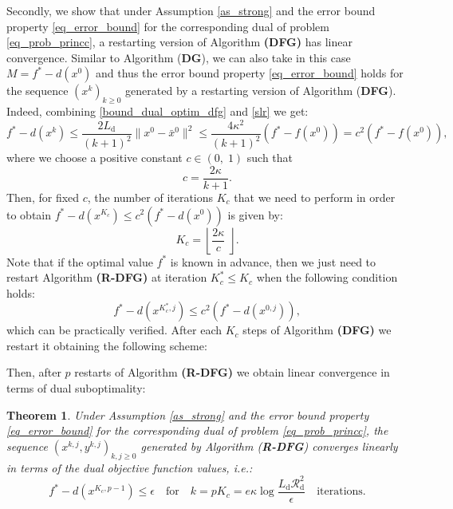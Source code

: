 \documentclass{gOMS2e}
\theoremstyle{plain}
\newtheorem{theorem}{Theorem}[section]
\theoremstyle{definition}
\theoremstyle{remark}
\begin{document}
\noindent Secondly, we  show that under Assumption \eqref{as_strong}
and the error bound property \eqref{eq_error_bound} for the
corresponding dual  of problem  \eqref{eq_prob_princc}, a restarting
version of Algorithm {\bf (DFG)} has linear convergence. Similar to
Algorithm (\textbf{DG}), we can also take in this  case  $M = f^*
-d(x^0)$ and thus the error bound property \eqref{eq_error_bound}
holds for the sequence $(x^k)_{k \geq 0}$ generated by  a restarting
version of Algorithm (\textbf{DFG}). Indeed, combining
\eqref{bound_dual_optim_dfg} and \eqref{slr} we get:
\[ f^* - d(x^k)   \leq \frac{2 L_\text{d}}{(k+1)^2} \| x^0 - \bar{x}^0\|^2 \leq
 \frac{4 \kappa^2}{(k+1)^2} (f^*  - f(x^0)) = c^2 (f^* - f(x^0)), \]
where we choose a positive constant $c \in (0, \; 1)$ such that
\[  c = \frac{2 \kappa }{k+1}. \]
Then, for fixed $c$, the number of iterations $K_c$ that we need to
perform in order to obtain $f^*  - d(x^{K_c})  \leq c^2 ( f^* - d(x^0)) $
is given by:
\[ K_c = \left  \lfloor \frac{2 \kappa}{c} \; \right \rfloor.  \]
Note that if the optimal value $f^*$ is known in advance, then we just need to
restart  Algorithm {\bf (R-DFG)} at iteration $K_c^* \leq
K_c$ when the following condition holds:
\[   f^* - d(x^{K_c^*,j})  \leq c^2 (f^* - d(x^{0,j})),  \]
which can be practically   verified. After each $K_c$ steps of Algorithm {\bf (DFG)} we
restart it obtaining the following scheme:
\begin{center}
\end{center}
Then, after $p$ restarts of Algorithm {\bf (R-DFG)} we obtain linear
convergence in terms of dual suboptimality:

\begin{theorem}
\label{th_ebdualsuboptdfg} Under Assumption \eqref{as_strong} and
the error  bound property \eqref{eq_error_bound} for the
corresponding dual  of problem  \eqref{eq_prob_princc},  the
sequence $\left(x^{k,j},y^{k,j} \right)_{k,j\geq 0}$  generated by
Algorithm ({\bf R-DFG}) converges linearly in terms of the  dual
objective function values, i.e.:
\begin{equation}
\label{bound_dual_optim_dfgeb}
 f^* - d({x}^{K_c,p-1}) \leq \epsilon \quad \text{for} \quad k = p K_c =
 e  \kappa  \log \frac{L_\text{d} \mathcal{R}_\text{d}^2}{\epsilon} \quad \text{iterations}.
\end{equation}
\end{theorem}
\end{document}

